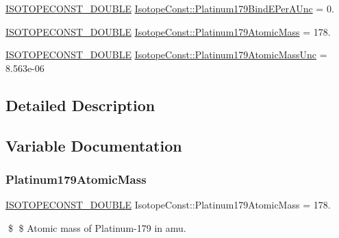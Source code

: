 \begin{DoxyCompactItemize}
\mbox{\hyperlink{group___isotope_const-_macros_ga8f45a7272ce02c0b4c65c44636ed719a}{I\+S\+O\+T\+O\+P\+E\+C\+O\+N\+S\+T\+\_\+\+D\+O\+U\+B\+LE}} \mbox{\hyperlink{group___isotope_const-_platinum-_pt179_ga1e3ae0d222738ee63d578bc30a68e73f}{Isotope\+Const\+::\+Platinum179\+Bind\+E\+Per\+A\+Unc}} = 0.
\item 
\mbox{\hyperlink{group___isotope_const-_macros_ga8f45a7272ce02c0b4c65c44636ed719a}{I\+S\+O\+T\+O\+P\+E\+C\+O\+N\+S\+T\+\_\+\+D\+O\+U\+B\+LE}} \mbox{\hyperlink{group___isotope_const-_platinum-_pt179_ga22ea5c34569d358f00990caed2781de9}{Isotope\+Const\+::\+Platinum179\+Atomic\+Mass}} = 178.
\item 
\mbox{\hyperlink{group___isotope_const-_macros_ga8f45a7272ce02c0b4c65c44636ed719a}{I\+S\+O\+T\+O\+P\+E\+C\+O\+N\+S\+T\+\_\+\+D\+O\+U\+B\+LE}} \mbox{\hyperlink{group___isotope_const-_platinum-_pt179_ga3300c970d829ef624177532e9907ada9}{Isotope\+Const\+::\+Platinum179\+Atomic\+Mass\+Unc}} = 8.\+563e-\/06
\end{DoxyCompactItemize}


\subsection{Detailed Description}


\subsection{Variable Documentation}
\mbox{\label{group___isotope_const-_platinum-_pt179_ga22ea5c34569d358f00990caed2781de9}} 
\subsubsection{\texorpdfstring{Platinum179\+Atomic\+Mass}{Platinum179AtomicMass}}
{\footnotesize\ttfamily \mbox{\hyperlink{group___isotope_const-_macros_ga8f45a7272ce02c0b4c65c44636ed719a}{I\+S\+O\+T\+O\+P\+E\+C\+O\+N\+S\+T\+\_\+\+D\+O\+U\+B\+LE}} Isotope\+Const\+::\+Platinum179\+Atomic\+Mass = 178.}

\$ \$ Atomic mass of Platinum-\/179 in amu. \mbox{\label{group___isotope_const-_platinum-_pt179_ga3300c970d829ef624177532e9907ada9}} 
